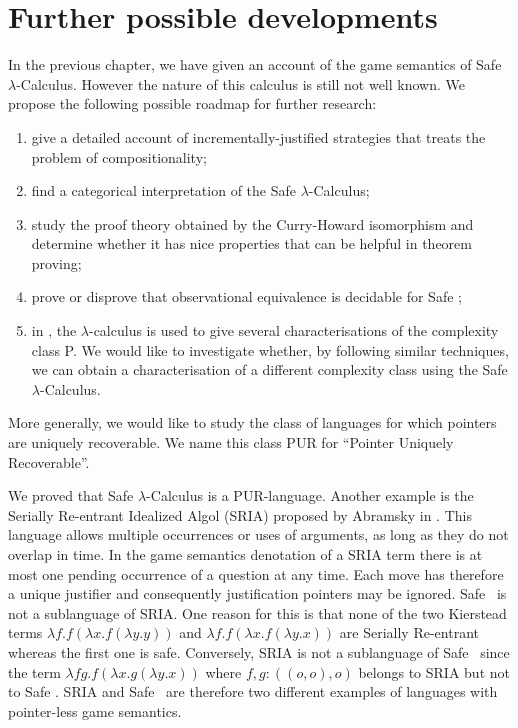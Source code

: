 \chapter{Further possible developments}

In the previous chapter, we have given an account of the game
semantics of Safe $\lambda$-Calculus. However the nature of this
calculus is still not well known. We propose the following possible
roadmap for further research:
\begin{enumerate}
\item give a detailed account of 
incrementally-justified strategies that treats the problem of compositionality;
\item find a categorical interpretation of the Safe $\lambda$-Calculus;
\item study the proof theory obtained by the Curry-Howard isomorphism and determine whether it has nice properties that can be helpful in theorem proving;
\item prove or disprove that observational equivalence is decidable for Safe \ialgol;
\item in \cite{DBLP:conf/tlca/LeivantM93}, the $\lambda$-calculus is used to
give several characterisations of the complexity class P. We would
like to investigate whether, by following similar techniques, we can
obtain a characterisation of a different complexity class using the
Safe $\lambda$-Calculus.
\end{enumerate}


More generally, we would like to study the class of languages for
which pointers are uniquely recoverable. We name this class PUR for
``Pointer Uniquely Recoverable''.

We proved that Safe $\lambda$-Calculus is a PUR-language. Another
example is the Serially Re-entrant Idealized Algol (SRIA) proposed
by Abramsky  in \cite{abramsky:mchecking_ia}. This language allows
multiple occurrences or uses of arguments, as long as they do not
overlap in time. In the game semantics denotation of a SRIA term
there is at most one pending occurrence of a question at any time.
Each move has therefore a unique justifier and consequently
justification pointers may be ignored. Safe \ialgol\ is not a
sublanguage of SRIA. One reason for this is that none of the two
Kierstead terms $\lambda f . f (\lambda x . f (\lambda y .y ))$ and
$\lambda f . f (\lambda x . f (\lambda y .x ))$ are Serially
Re-entrant whereas the first one is safe. Conversely, SRIA is not a
sublanguage of Safe \ialgol\ since the term $\lambda f g. f (\lambda
x . g (\lambda y .x ))$ where $f,g:((o,o),o)$ belongs to SRIA but
not to Safe \ialgol. SRIA and Safe \ialgol\ are therefore two
different examples of languages with pointer-less game semantics.

